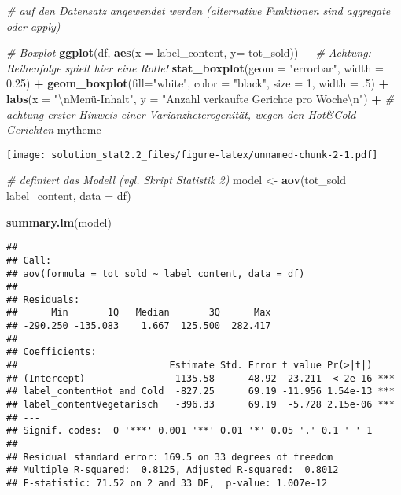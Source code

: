\documentclass[
]{article}
\newenvironment{Shaded}{\begin{snugshade}}{\end{snugshade}}
\newcommand{\CharTok}[1]{\textcolor[rgb]{0.31,0.60,0.02}{#1}}
\newcommand{\CommentTok}[1]{\textcolor[rgb]{0.56,0.35,0.01}{\textit{#1}}}
\newcommand{\DataTypeTok}[1]{\textcolor[rgb]{0.13,0.29,0.53}{#1}}
\newcommand{\DecValTok}[1]{\textcolor[rgb]{0.00,0.00,0.81}{#1}}
\newcommand{\FloatTok}[1]{\textcolor[rgb]{0.00,0.00,0.81}{#1}}
\newcommand{\KeywordTok}[1]{\textcolor[rgb]{0.13,0.29,0.53}{\textbf{#1}}}
\newcommand{\NormalTok}[1]{#1}
\newcommand{\OperatorTok}[1]{\textcolor[rgb]{0.81,0.36,0.00}{\textbf{#1}}}
\newcommand{\StringTok}[1]{\textcolor[rgb]{0.31,0.60,0.02}{#1}}
\begin{document}
\begin{Shaded}
\begin{Highlighting}[]
\CommentTok{# auf den Datensatz angewendet werden (alternative Funktionen sind aggregate oder apply)}


\CommentTok{# Boxplot}
\KeywordTok{ggplot}\NormalTok{(df, }\KeywordTok{aes}\NormalTok{(}\DataTypeTok{x =}\NormalTok{ label_content, }\DataTypeTok{y=}\NormalTok{ tot_sold)) }\OperatorTok{+}
\StringTok{  }\CommentTok{# Achtung: Reihenfolge spielt hier eine Rolle!}
\StringTok{  }\KeywordTok{stat_boxplot}\NormalTok{(}\DataTypeTok{geom =} \StringTok{"errorbar"}\NormalTok{, }\DataTypeTok{width =} \FloatTok{0.25}\NormalTok{) }\OperatorTok{+}
\StringTok{  }\KeywordTok{geom_boxplot}\NormalTok{(}\DataTypeTok{fill=}\StringTok{"white"}\NormalTok{, }\DataTypeTok{color =} \StringTok{"black"}\NormalTok{, }\DataTypeTok{size =} \DecValTok{1}\NormalTok{, }\DataTypeTok{width =} \FloatTok{.5}\NormalTok{) }\OperatorTok{+}
\StringTok{  }\KeywordTok{labs}\NormalTok{(}\DataTypeTok{x =} \StringTok{"}\CharTok{\textbackslash{}n}\StringTok{Menü-Inhalt"}\NormalTok{, }\DataTypeTok{y =} \StringTok{"Anzahl verkaufte Gerichte pro Woche}\CharTok{\textbackslash{}n}\StringTok{"}\NormalTok{) }\OperatorTok{+}\StringTok{ }
\StringTok{  }\CommentTok{# achtung erster Hinweis einer Varianzheterogenität, wegen den Hot&Cold Gerichten}
\StringTok{  }\NormalTok{mytheme }
\end{Highlighting}
\end{Shaded}

\texttt{[image: solution\_stat2.2\_files/figure-latex/unnamed-chunk-2-1.pdf]}

\begin{Shaded}
\begin{Highlighting}[]
\CommentTok{# definiert das Modell (vgl. Skript Statistik 2)}
\NormalTok{model <-}\StringTok{ }\KeywordTok{aov}\NormalTok{(tot_sold }\OperatorTok{~}\StringTok{ }\NormalTok{label_content, }\DataTypeTok{data =}\NormalTok{ df)}

\KeywordTok{summary.lm}\NormalTok{(model)}
\end{Highlighting}
\end{Shaded}

\begin{verbatim}
## 
## Call:
## aov(formula = tot_sold ~ label_content, data = df)
## 
## Residuals:
##      Min       1Q   Median       3Q      Max 
## -290.250 -135.083    1.667  125.500  282.417 
## 
## Coefficients:
##                           Estimate Std. Error t value Pr(>|t|)    
## (Intercept)                1135.58      48.92  23.211  < 2e-16 ***
## label_contentHot and Cold  -827.25      69.19 -11.956 1.54e-13 ***
## label_contentVegetarisch   -396.33      69.19  -5.728 2.15e-06 ***
## ---
## Signif. codes:  0 '***' 0.001 '**' 0.01 '*' 0.05 '.' 0.1 ' ' 1
## 
## Residual standard error: 169.5 on 33 degrees of freedom
## Multiple R-squared:  0.8125, Adjusted R-squared:  0.8012 
## F-statistic: 71.52 on 2 and 33 DF,  p-value: 1.007e-12
\end{verbatim}
\end{document}
